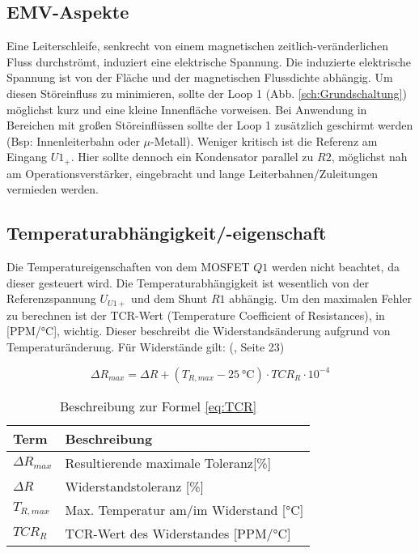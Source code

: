 \subsection{EMV-Aspekte} 
\label{sec:EMV}
Eine Leiterschleife, senkrecht von einem magnetischen zeitlich-veränderlichen Fluss durchströmt, induziert eine elektrische 
Spannung. 
Die induzierte elektrische Spannung ist von der Fläche und der  magnetischen Flussdichte abhängig. Um diesen Störeinfluss 
zu minimieren, sollte der Loop 1 (Abb. \ref{sch:Grundschaltung}) möglichst kurz und eine kleine Innenfläche vorweisen. 
Bei Anwendung in Bereichen mit großen Störeinflüssen sollte der Loop 1 zusätzlich geschirmt 
werden (Bsp: Innenleiterbahn oder $\mu$-Metall). 
Weniger kritisch ist die Referenz am Eingang $U1_{+}$. 
Hier sollte dennoch ein Kondensator parallel zu $R2$, möglichst nah am Operationsverstärker, 
eingebracht und lange Leiterbahnen/Zuleitungen vermieden werden.

\subsection{Temperaturabhängigkeit/-eigenschaft}

Die Temperatureigenschaften von dem MOSFET $Q1$ werden nicht beachtet, da dieser gesteuert wird. Die Temperaturabhängigkeit ist 
wesentlich von der Referenzspannung $U_{U1+}$ und dem Shunt $R1$ abhängig. Um den maximalen Fehler zu berechnen ist der TCR-Wert 
(Temperature Coefficient of Resistances), in [PPM/°C], wichtig. 
Dieser beschreibt die Widerstandsänderung aufgrund von Temperaturänderung. 
Für Widerstände gilt: (\cite{TCR_rechnen}, Seite 23)

\begin{equation}
	\label{eq:TCR}
	\Delta R_{max} = \Delta R + (T_{R,max} - \SI{25}{\celsius}) \cdot TCR_{R} \cdot10^{-4}
\end{equation}

\begin{table}[h!]
	\centering
	\caption{Beschreibung zur Formel \ref{eq:TCR}}
	\label{tab:Beschreibung_TCR}
	\normalsize
	\begin{tabular}{l|l}
		Term & Beschreibung \\
		\hline
		$\Delta R_{max}$& Resultierende maximale Toleranz[\%]\\
		$\Delta R$		& Widerstandstoleranz [\%] \\
		$T_{R,max}$		& Max. Temperatur am/im Widerstand [°C]\\
		$TCR_{R}$		& TCR-Wert des Widerstandes [PPM/°C]\\
	\end{tabular}
\end{table}

